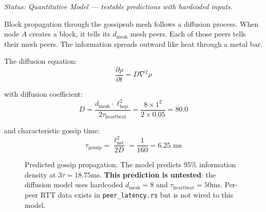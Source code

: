 \documentclass[11pt,a4paper]{article}
\begin{document}
\emph{Status: \textcolor{hardcoded}{Quantitative Model} --- testable predictions with hardcoded inputs.}

Block propagation through the gossipsub mesh follows a diffusion process. When node $A$ creates a block, it tells its $d_{\text{mesh}}$ mesh peers. Each of those peers tells their mesh peers. The information spreads outward like heat through a metal bar.

The diffusion equation:
\begin{equation}
\frac{\partial \rho}{\partial t} = D \nabla^2 \rho
\end{equation}

with diffusion coefficient:
\begin{equation}
D = \frac{d_{\text{mesh}} \cdot \ell_{\text{hop}}^2}{2\tau_{\text{heartbeat}}} = \frac{8 \times 1^2}{2 \times 0.05} = 80.0
\end{equation}

and characteristic gossip time:
\begin{equation}
\tau_{\text{gossip}} = \frac{\ell_{\text{net}}^2}{2D} = \frac{1}{160} = 6.25 \text{ ms}
\end{equation}

\begin{figure}[H]
\centering
{}
\caption{Predicted gossip propagation. The model predicts 95\% information density at $3\tau = 18.75$ms. \textbf{This prediction is untested}: the diffusion model uses hardcoded $d_{\text{mesh}} = 8$ and $\tau_{\text{heartbeat}} = 50$ms. Per-peer RTT data exists in \texttt{peer\_latency.rs} but is not wired to this model.}
\label{fig:diffusion}
\end{figure}
\end{document}
